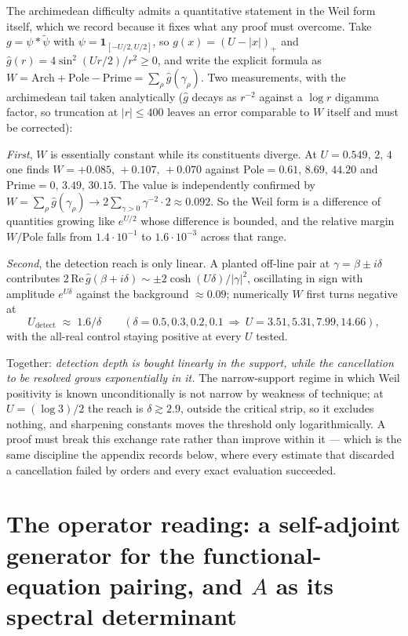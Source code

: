 \documentclass[11pt]{article}
\theoremstyle{plain}
\theoremstyle{definition}
\theoremstyle{remark}
\begin{document}
The archimedean difficulty admits a quantitative statement in the Weil form
itself, which we record because it fixes what any proof must overcome. Take
$g=\psi*\tilde\psi$ with $\psi=\mathbf 1_{[-U/2,U/2]}$, so $g(x)=(U-|x|)_+$ and
$\hat g(r)=4\sin^2(Ur/2)/r^2\ge0$, and write the explicit formula as
$W=\mathrm{Arch}+\mathrm{Pole}-\mathrm{Prime}=\sum_\rho\hat g(\gamma_\rho)$.
Two measurements, with the archimedean tail taken analytically
($\hat g$ decays as $r^{-2}$ against a $\log r$ digamma factor, so truncation at
$|r|\le400$ leaves an error comparable to $W$ itself and must be corrected):

\emph{First}, $W$ is essentially constant while its constituents diverge. At
$U=0.549,\,2,\,4$ one finds $W=+0.085,\,+0.107,\,+0.070$ against
$\mathrm{Pole}=0.61,\,8.69,\,44.20$ and $\mathrm{Prime}=0,\,3.49,\,30.15$. The
value is independently confirmed by $W=\sum_\rho\hat g(\gamma_\rho)\to
2\sum_{\gamma>0}\gamma^{-2}\cdot2\approx0.092$. So the Weil form is a
difference of quantities growing like $e^{U/2}$ whose difference is bounded, and
the relative margin $W/\mathrm{Pole}$ falls from $1.4\cdot10^{-1}$ to
$1.6\cdot10^{-3}$ across that range.

\emph{Second}, the detection reach is only linear. A planted off-line pair at
$\gamma=\beta\pm i\delta$ contributes
$2\,\mathrm{Re}\,\hat g(\beta+i\delta)\sim\pm2\cosh(U\delta)/|\gamma|^2$,
oscillating in sign with amplitude $e^{U\delta}$ against the background
$\approx0.09$; numerically $W$ first turns negative at
\[
  U_{\mathrm{detect}}\;\approx\;1.6/\delta
  \qquad(\delta=0.5,0.3,0.2,0.1\ \Rightarrow\ U=3.51,5.31,7.99,14.66),
\]
with the all-real control staying positive at every $U$ tested.

Together: \emph{detection depth is bought linearly in the support, while the
cancellation to be resolved grows exponentially in it.} The narrow-support
regime in which Weil positivity is known unconditionally is not narrow by
weakness of technique; at $U=(\log3)/2$ the reach is $\delta\gtrsim2.9$, outside
the critical strip, so it excludes nothing, and sharpening constants moves the
threshold only logarithmically. A proof must break this exchange rate rather
than improve within it --- which is the same discipline the appendix records
below, where every estimate that discarded a cancellation failed by orders and
every exact evaluation succeeded.

\section{The operator reading: a self-adjoint generator for the
functional-equation pairing, and $A$ as its spectral determinant}
\label{sec:operatorreading}
\end{document}
